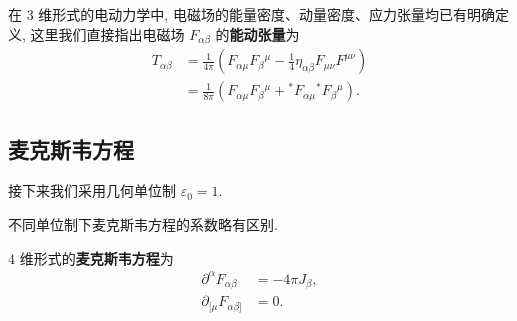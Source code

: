 在 $3$ 维形式的电动力学中, 电磁场的能量密度、动量密度、应力张量均已有明确定义\cite[上册 178 页]{梁灿彬2000微分几何入门与广义相对论}, 这里我们直接指出电磁场 $ F_{\alpha\beta} $ 的{\bf 能动张量}为
\begin{align*}
    T_{\alpha\beta}&=\frac{1}{4\pi}\left( F_{\alpha\mu}F_\beta{}^\mu-\frac{1}{4}\eta_{\alpha\beta}F_{\mu\nu}F^{\mu\nu} \right)\\
    &=\frac{1}{8\pi}(F_{\alpha\mu}F_\beta{}^\mu+{}^{*} F_{\alpha\mu}{}^{*}F_{\beta}{}^\mu).
\end{align*}

\subsection{麦克斯韦方程}
接下来我们采用几何单位制 $ \varepsilon_0=1 $.
\begin{remark}
    不同单位制下麦克斯韦方程的系数略有区别.
\end{remark} 
\begin{definition}[$4$ 维麦克斯韦方程]
    $ 4 $ 维形式的{\bf 麦克斯韦方程}为
    \begin{align*}
        \partial^\alpha F_{\alpha\beta}&=-4\pi J_\beta\tag{$M_1$},\\ 
        \partial_{[\mu}F_{\alpha\beta]}&=0\tag{$M_2$}.
    \end{align*}
\end{definition}

